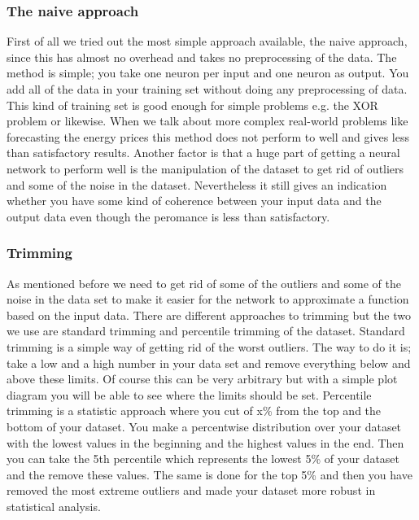 \subsubsection{The naive approach}
First of all we tried out the most simple approach available, the naive approach, since this has almost no overhead and takes no preprocessing of the data. The method is simple; you take one neuron per input and one neuron as output. You add all of the data in your training set without doing any preprocessing of data. This kind of training set is good enough for simple problems e.g. the XOR problem or likewise. When we talk about more complex real-world problems like forecasting the energy prices this method does not perform to well and gives less than satisfactory results. Another factor is that a huge part of getting a neural network to perform well is the manipulation of the dataset to get rid of outliers and some of the noise in the dataset. Nevertheless it still gives an indication whether you have some kind of coherence between your input data and the output data even though the peromance is less than satisfactory. 

\subsubsection{Trimming}\label{sec:Trimming}
As mentioned before we need to get rid of some of the outliers and some of the noise in the data set to make it easier for the network to approximate a function based on the input data. There are different approaches to trimming but the two we use are standard trimming and percentile trimming of the dataset. Standard trimming is a simple way of getting rid of the worst outliers. The way to do it is; take a low and a high number in your data set and remove everything below and above these limits. Of course this can be very arbitrary but with a simple plot diagram you will be able to see where the limits should be set. Percentile trimming is a statistic approach where you cut of x\% from the top and the bottom of your dataset. You make a percentwise distribution over your dataset with the lowest values in the beginning and the highest values in the end. Then you can take the 5th percentile which represents the lowest 5\% of your dataset and the remove these values. The same is done for the top 5\% and then you have removed the most extreme outliers and made your dataset more robust in statistical analysis.

